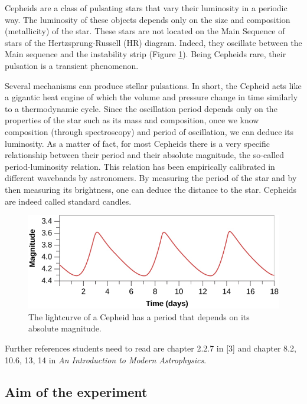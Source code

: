 \documentclass[a4paper, 11pt, fleqn]{memoir}
\begin{document}
Cepheids are a class of pulsating stars that vary their luminosity in a periodic way.
The luminosity of these objects depends only on the size and composition (metallicity) of the star.
These stars are not located on the Main Sequence of stars of the Hertzsprung-Russell (HR) diagram.
Indeed, they oscillate between the Main sequence and the instability strip (Figure \cref{fig:cepheid-lightcurve}).
Being Cepheids rare, their pulsation is a transient phenomenon.

Several mechanisms can produce stellar pulsations.
In short, the Cepheid acts like a gigantic heat engine of which the volume and pressure change in time similarly to a thermodynamic cycle.
Since the oscillation period depends only on the properties of the star such as its mass and composition, once we know composition (through spectroscopy) and period of oscillation, we can deduce its luminosity.
As a matter of fact, for most Cepheids there is a very specific relationship between their period and their absolute magnitude, the so-called period-luminosity relation.
This relation has been empirically calibrated in different wavebands by astronomers.
By measuring the period of the star and by then measuring its brightness, one can deduce the distance to the star.
Cepheids are indeed called standard candles.

\begin{figure}
    \centering
    \includegraphics[width=0.7 \textwidth]{cepheid-light-curve}
    \caption{The lightcurve of a Cepheid has a period that depends on its absolute magnitude. %
    }
    \label{fig:cepheid-lightcurve}
\end{figure}

Further references students need to read are chapter 2.2.7 in [3] and chapter 8.2, 10.6, 13, 14 in \emph{An Introduction to Modern Astrophysics}\autocite{carroll2017introduction}.

\subsection{Aim of the experiment}
\end{document}
